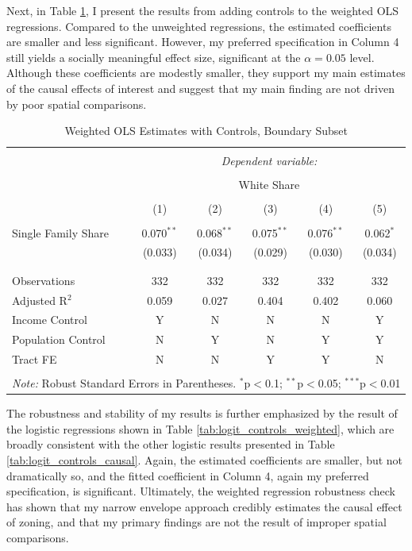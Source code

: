 \documentclass[11pt]{article}
\begin{document}
Next, in Table \ref{tab:OLS_controls_weighted}, I present the results from adding controls to the weighted OLS regressions. Compared to the unweighted regressions, the estimated coefficients are smaller and less significant. However, my preferred specification in Column 4 still yields a socially meaningful effect size, significant at the $\alpha=0.05$ level. Although these coefficients are modestly smaller, they support my main estimates of the causal effects of interest and suggest that my main finding are not driven by poor spatial comparisons.

\begin{table}[!htbp] \centering 
  \caption{Weighted OLS Estimates with Controls, Boundary Subset} 
  \label{tab:OLS_controls_weighted} 
\begin{tabular}{@{\extracolsep{5pt}}lccccc} 
\\[-1.8ex]\hline 
\hline \\[-1.8ex] 
 & \multicolumn{5}{c}{\textit{Dependent variable:}} \\ 
\cline{2-6} 
\\[-1.8ex] & \multicolumn{5}{c}{White Share} \\ 
\\[-1.8ex] & (1) & (2) & (3) & (4) & (5)\\ 
\hline \\[-1.8ex] 
 Single Family Share & 0.070$^{**}$ & 0.068$^{**}$ & 0.075$^{**}$ & 0.076$^{**}$ & 0.062$^{*}$ \\ 
  & (0.033) & (0.034) & (0.029) & (0.030) & (0.034) \\ 
  & & & & & \\ 
\hline \\[-1.8ex] 
Observations & 332 & 332 & 332 & 332 & 332 \\ 
Adjusted R$^{2}$ & 0.059 & 0.027 & 0.404 & 0.402 & 0.060 \\ 
\hline
Income Control & Y & N & N & N & Y\\
Population Control & N & Y & N & Y & Y\\
Tract FE & N & N & Y & Y & N\\
\hline 
\hline \\[-1.8ex] 
\multicolumn{6}{l}{\textit{Note:} Robust Standard Errors in Parentheses. $^{*}$p$<$0.1; $^{**}$p$<$0.05; $^{***}$p$<$0.01} \\
\end{tabular} 
\end{table}

The robustness and stability of my results is further emphasized by the result of the logistic regressions shown in Table \ref{tab:logit_controls_weighted}, which are broadly consistent with the other logistic results presented in Table \ref{tab:logit_controls_causal}. Again, the estimated coefficients are smaller, but not dramatically so, and the fitted coefficient in Column 4, again my preferred specification, is significant. Ultimately, the weighted regression robustness check has shown that my narrow envelope approach credibly estimates the causal effect of zoning, and that my primary findings are not the result of improper spatial comparisons.
\end{document}
